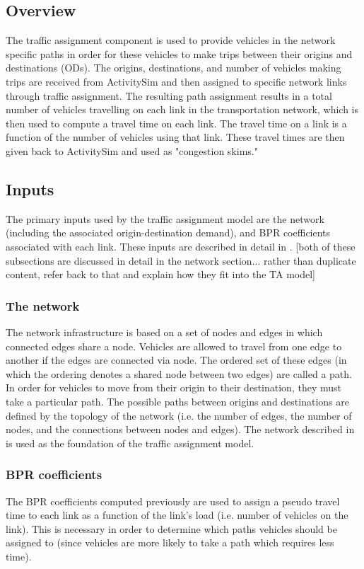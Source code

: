 \subsection{Overview}
The traffic assignment component is used to provide vehicles in the network specific paths in order for these vehicles to make trips between their origins and destinations (ODs). The origins, destinations, and number of vehicles making trips are received from ActivitySim and then assigned to specific network links through traffic assignment. The resulting path assignment results in a total number of vehicles travelling on each link in the transportation network, which is then used to compute a travel time on each link. The travel time on a link is a function of the number of vehicles using that link. These travel times are then given back to ActivitySim and used as "congestion skims." 


\subsection{Inputs}
The primary inputs used by the traffic assignment model are the network (including the associated origin-destination demand), and BPR coefficients associated with each link. These inputs are described in detail in .
[both of these subsections are discussed in detail in the network section... rather than duplicate content, refer back to that and explain how they fit into the TA model]


\subsubsection{The network}
The network infrastructure is based on a set of nodes and edges in which connected edges share a node. Vehicles are allowed to travel from one edge to another if the edges are connected via node. The ordered set of these edges (in which the ordering denotes a shared node between two edges) are called a path. In order for vehicles to move from their origin to their destination, they must take a particular path. The possible paths between origins and destinations are defined by the topology of the network (i.e. the number of edges, the number of nodes, and the connections between nodes and edges). The network described in  is used as the foundation of the traffic assignment model. 


\subsubsection{BPR coefficients}
The BPR coefficients computed previously are used to assign a pseudo travel time to each link as a function of the link's load (i.e. number of vehicles on the link). This is necessary in order to determine which paths vehicles should be assigned to (since vehicles are more likely to take a path which requires less time).

